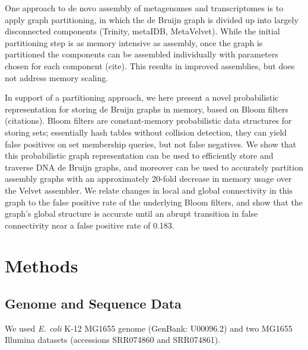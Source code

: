 \documentclass[12pt]{article} \usepackage{simplemargins}
\begin{document}
One approach to de novo assembly of metagenomes and transcriptomes is
to apply graph partitioning, in which the de Bruijn graph is divided
up into largely disconnected components (Trinity, metaIDB,
MetaVelvet).  While the initial partitioning step is as memory
intensive as assembly, once the graph is partitioned the components
can be assembled individually with parameters chosen for each
component (cite).  This results in improved assemblies, but does not
address memory scaling.

In support of a partitioning approach, we here present a novel
probabilistic representation for storing de Bruijn graphs in memory,
based on Bloom filters (citations).  Bloom filters are constant-memory
probabilistic data structures for storing sets; essentially hash
tables without collision detection, they can yield false positives on
set membership queries, but not false negatives.  We show that this
probabilistic graph representation can be used to efficiently store
and traverse DNA de Bruijn graphs, and moreover can be used to
accurately partition assembly graphs with an approximately 20-fold
decrease in memory usage over the Velvet assembler.  We relate changes
in local and global connectivity in this graph to the false positive
rate of the underlying Bloom filters, and show that the graph's global
structure is accurate until an abrupt transition in false connectivity
near a false positive rate of 0.183.


\section{Methods}

\subsection{Genome and Sequence Data}
We used \emph{E. coli} K-12 MG1655 genome (GenBank: U00096.2) and two MG1655 Illumina 
datasets (accessions SRR074860 and SRR074861). 
\end{document}
